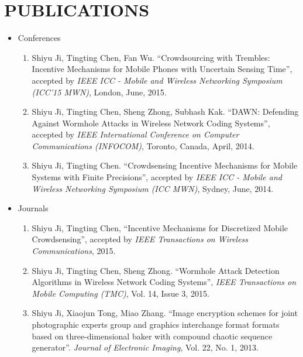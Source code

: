 \documentclass{article}
\begin{document}
\section{\uppercase{Publications}}
\begin{itemize}
\item {Conferences}
\begin{enumerate}
\item Shiyu Ji, Tingting Chen, Fan Wu. ``Crowdsourcing with Trembles: Incentive Mechanisms for Mobile Phones with Uncertain Sensing Time'', accepted by {\it IEEE ICC - Mobile and Wireless Networking Symposium (ICC'15 MWN)}, London, June, 2015.

\item Shiyu Ji, Tingting Chen, Sheng Zhong, Subhash Kak. ``DAWN: Defending Against Wormhole Attacks in Wireless Network Coding Systems'', accepted by {\it IEEE International Conference on Computer Communications (INFOCOM)}, Toronto, Canada, April, 2014.

\item Shiyu Ji, Tingting Chen. ``Crowdsensing Incentive Mechanisms for Mobile Systems with Finite Precisions'', accepted by {\it IEEE ICC - Mobile and Wireless Networking Symposium (ICC MWN)}, Sydney, June, 2014.
\end{enumerate}

\item{Journals}
\begin{enumerate}
\item Shiyu Ji, Tingting Chen, ``Incentive Mechanisms for Discretized Mobile Crowdsensing'', accepted by {\it IEEE Transactions on Wireless Communications}, 2015.

\item Shiyu Ji, Tingting Chen, Sheng Zhong. ``Wormhole Attack Detection Algorithms in Wireless Network Coding Systems'', {\it IEEE Transactions on Mobile Computing (TMC)}, Vol. 14, Issue 3, 2015.

\item Shiyu Ji, Xiaojun Tong, Miao Zhang. ``Image encryption schemes for joint photographic experts group and graphics interchange format formats based on three-dimensional baker with compound chaotic sequence generator''. {\it Journal of Electronic Imaging}, Vol. 22, No. 1, 2013.
\end{enumerate}
\end{itemize}
\end{document}

